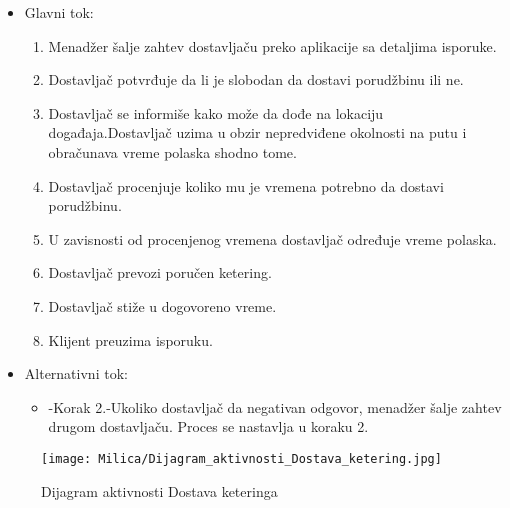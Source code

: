 \documentclass[a4paper]{article}
\begin{document}
      \begin{itemize}
        \item Glavni tok:
          \begin{enumerate}
          
              \item Menadžer šalje zahtev dostavljaču preko aplikacije sa detaljima isporuke.
          
              \item Dostavljač potvrđuje da li je slobodan da dostavi porudžbinu ili ne.
              
              \item Dostavljač se informiše kako može da dođe na lokaciju događaja.Dostavljač uzima u obzir nepredviđene okolnosti na putu i obračunava vreme polaska shodno tome.
        
              \item Dostavljač procenjuje koliko mu je vremena potrebno da dostavi porudžbinu.
         
              \item U zavisnosti od procenjenog vremena dostavljač određuje vreme polaska.
      
              \item Dostavljač prevozi poručen ketering.
         
              \item Dostavljač stiže u dogovoreno vreme.
         
              \item Klijent preuzima isporuku.
          \end{enumerate}
    \end{itemize}
      \begin{itemize}
        \item Alternativni tok:
          \begin{itemize}
        \item -Korak 2.-Ukoliko dostavljač da negativan odgovor, menadžer šalje zahtev drugom dostavljaču. Proces se nastavlja u koraku 2.
    \end{itemize}
    \end{itemize}
    
\begin{figure}[H]
    \centering
    \texttt{[image: Milica/Dijagram\_aktivnosti\_Dostava\_ketering.jpg]}
    \caption{Dijagram aktivnosti Dostava keteringa}
    \label{fig:RegistracijaZ}
\end{figure}
\end{document}
